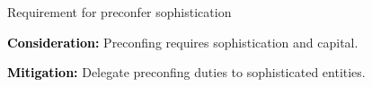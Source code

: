 \documentclass[a4paper]{article}
\theoremstyle{boldstyle}
\newlength{\entrysep}
\newcommand{\consideration}[1]{\par\noindent\textbf{\textcolor{black}{Consideration:}} #1\par\vspace{\entrysep}}
\newcommand{\mitigation}[1]{\par\noindent\textbf{\textcolor{black}{Mitigation:}} #1}
\newcommand{\todoqb}[1]{\todo[color=red!40]{\textbf{Quentin:} #1}}
\begin{document}
        \begin{considerationbox}{Requirement for preconfer sophistication}
            \consideration{Preconfing requires sophistication and capital.}
            \mitigation{Delegate preconfing duties to sophisticated entities.}
        \end{considerationbox}

\end{document}
